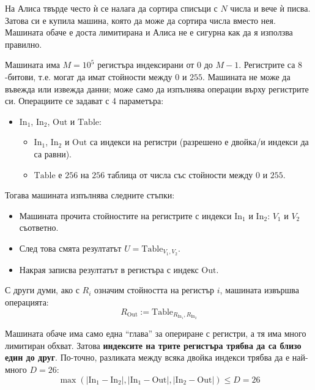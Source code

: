 \documentclass[12pt]{article}
\begin{document}
\renewcommand{\tl}{$8$ сек.}
\renewcommand{\ml}{$512$ MB}
\renewcommand{\header}{
    НАЦИОНАЛЕН ЛЕТЕН ТУРНИР ПО ИНФОРМАТИКА\\
    Пловдив, 6-8 юни 2025 г.\\
    Група A, 11-12 клас
}

На Алиса твърде често ѝ се налага да сортира списъци с $N$ числа и вече ѝ писва.
Затова си е купила машина, която да може да сортира числа вместо нея.
Машината обаче е доста лимитирана и Алиса не е сигурна как да я използва правилно.

Машината има $M=10^5$ регистъра индексирани от $0$ до $M-1$. Регистрите са $8$-битови, т.е. могат да имат стойности между $0$ и $255$.
Машината не може да въвежда или извежда данни; може само да изпълнява операции върху регистрите си.
Операциите се задават с 4 параметъра:
\begin{itemize}
\item $\mathrm{In}_1$, $\mathrm{In}_2$, $\mathrm{Out}$ и $\mathrm{Table}$:
\begin{itemize}
\item $\mathrm{In}_1$, $\mathrm{In}_2$ и $\mathrm{Out}$ са индекси на регистри (разрешено е двойка/и индекси да са равни).
\item $\mathrm{Table}$ е $256$ на $256$ таблица от числа със стойности между $0$ и $255$.
\end{itemize}
\end{itemize}
Тогава машината изпълнява следните стъпки:
\begin{itemize}
\item Машината прочита стойностите на регистрите с индекси $\mathrm{In}_1$ и $\mathrm{In}_2$: $V_1$ и $V_2$ съответно.
\item След това смята резултатът $U = \mathrm{Table}_{V_1, V_2}$.
\item Накрая записва резултатът в регистъра с индекс $\mathrm{Out}$.
\end{itemize}
С други думи, ако с $R_i$ означим стойността на регистър $i$, машината извършва операцията:
\begingroup
\setlength\abovedisplayskip{4pt}
\setlength\belowdisplayskip{0pt}
\begin{equation*}
R_{\mathrm{Out}} := \mathrm{Table}_{R_{\mathrm{In}_1}, R_{\mathrm{In}_2}}
\end{equation*}
\endgroup

Машината обаче има само една ``глава'' за опериране с регистри, а тя има много лимитиран обхват.
Затова \textbf{индексите на трите регистъра трябва да са близо един до друг}.
По-точно, разликата между всяка двойка индекси трябва да е най-много $D=26$:
\begingroup
\setlength\abovedisplayskip{4pt}
\setlength\belowdisplayskip{0pt}
\begin{equation*}
\max\left(\left\lvert \mathrm{In}_1 - \mathrm{In}_2 \right\rvert, \left\lvert \mathrm{In}_1 - \mathrm{Out} \right\rvert, \left\lvert \mathrm{In}_2 - \mathrm{Out} \right\rvert\right) \leq D=26
\end{equation*}
\endgroup
\end{document}
